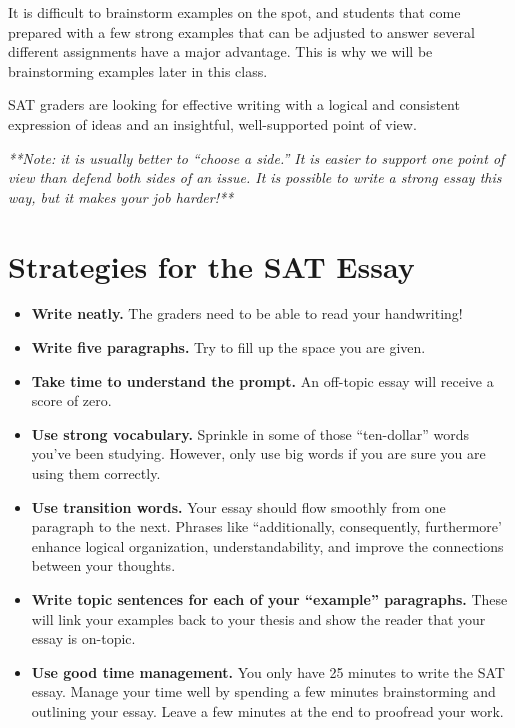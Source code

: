 \documentclass[12pt]{book}
\begin{document}
\bigskip
It is difficult to brainstorm examples on the spot, and students that come prepared with a few strong examples that can be adjusted to answer several different assignments have a major advantage. This is why we will be brainstorming examples later in this class. 

\bigskip
SAT graders are looking for effective writing with a logical and consistent expression of ideas and an insightful, well-supported point of view.

\bigskip
\textit{**Note: it is usually better to “choose a side.”  It is easier to support one point of view than defend both sides of an issue.  It is possible to write a strong essay this way, but it makes your job harder!**}

\pagebreak
\section{Strategies for the SAT Essay}    %
\begin{itemize}
\vfill
\item{\textbf{Write neatly.}  The graders need to be able to read your handwriting!}
\vfill

\item{\textbf{Write five paragraphs.}  Try to fill up the space you are given.}


\vfill
\item{\textbf{Take time to understand the prompt.}  An off-topic essay will receive a score of zero.}

\vfill
\item{\textbf{Use strong vocabulary.}  Sprinkle in some of those “ten-dollar” words you've been studying.  However, only use big words if you are sure you are using them correctly.}
\vfill

\item{\textbf{Use transition words.}  Your essay should flow smoothly from one paragraph to the next.  Phrases like ``additionally, consequently, furthermore' enhance logical organization, understandability, and improve the connections between your thoughts.}

\vfill

\item{\textbf{Write topic sentences for each of your “example” paragraphs.}  These will link your examples back to your thesis and show the reader that your essay is on-topic.  }

\vfill
\item{\textbf{Use good time management.} You only have 25 minutes to write the SAT essay.  Manage your time well by spending a few minutes brainstorming and outlining your essay.  Leave a few minutes at the end to proofread your work.}
\end{itemize}
\end{document}
